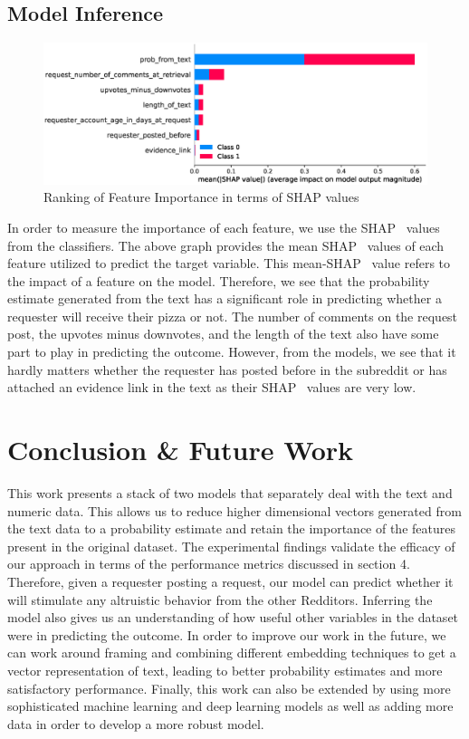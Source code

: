 \documentclass[runningheads]{llncs}
\begin{document}
\subsection{Model Inference}
\begin{figure}
\includegraphics[width=\textwidth]{FeatureImportanceShapley_minmax.eps}
\caption{Ranking of Feature Importance in terms of SHAP values} \label{fig4}
\end{figure}
In order to measure the importance of each feature, we use the SHAP~\cite{shap} values from the classifiers. The above graph provides the mean SHAP~\cite{shap} values of each feature utilized to predict the target variable. This mean-SHAP~\cite{shap} value refers to the impact of a feature on the model. Therefore, we see that the probability estimate generated from the text has a significant role in predicting whether a requester will receive their pizza or not. The number of comments on the request post, the upvotes minus downvotes, and the length of the text also have some part to play in predicting the outcome. However, from the models, we see that it hardly matters whether the requester has posted before in the subreddit or has attached an evidence link in the text as their SHAP~\cite{shap} values are very low.

\section{Conclusion \& Future Work}
This work presents a stack of two models that separately deal with the text and numeric data. This allows us to reduce higher dimensional vectors generated from the text data to a probability estimate and retain the importance of the features present in the original dataset. The experimental findings validate the efficacy of our approach in terms of the performance metrics discussed in section 4. Therefore, given a requester posting a request, our model can predict whether it will stimulate any altruistic behavior from the other Redditors. Inferring the model also gives us an understanding of how useful other variables in the dataset were in predicting the outcome. In order to improve our work in the future, we can work around framing and combining different embedding techniques to get a vector representation of text, leading to better probability estimates and more satisfactory performance. Finally, this work can also be extended by using more sophisticated machine learning and deep learning models as well as adding more data in order to develop a more robust model.
\end{document}
